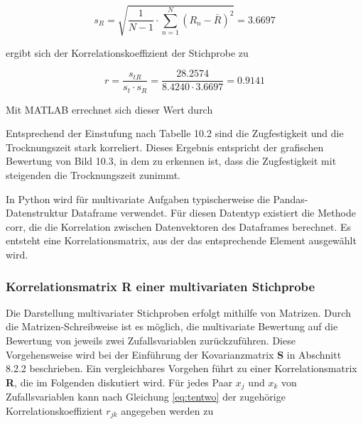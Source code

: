 \begin{equation}\label{eq:tenfive}
s_{R} =\sqrt{\dfrac{1}{N-1} \cdot \sum _{n=1}^{N}(R_{n} -\bar{R})^{2}} =3.6697
\end{equation}

\noindent ergibt sich der Korrelationskoeffizient der Stichprobe zu

\begin{equation}\label{eq:tensix}
r=\dfrac{s_{tR}}{s_{t} \cdot s_{R}} =\dfrac{28.2574}{8.4240\cdot 3.6697} =0.9141
\end{equation}

\noindent Mit MATLAB errechnet sich dieser Wert durch



\noindent Entsprechend der Einstufung nach Tabelle 10.2 sind die Zugfestigkeit und die Trocknungszeit stark korreliert. Dieses Ergebnis entspricht der grafischen Bewertung von Bild 10.3, in dem zu erkennen ist, dass die Zugfestigkeit mit steigenden die Trocknungszeit zunimmt.\newline

\noindent In Python wird f\"{u}r multivariate Aufgaben typischerweise die Pandas-Datenstruktur Dataframe verwendet. F\"{u}r diesen Datentyp existiert die Methode corr, die die Korrelation zwischen Datenvektoren des Dataframes berechnet. Es entsteht eine Korrelationsmatrix, aus der das entsprechende Element ausgew\"{a}hlt wird.

\clearpage



\subsubsection{Korrelationsmatrix R einer multivariaten Stichprobe}

\noindent Die Darstellung multivariater Stichproben erfolgt mithilfe von Matrizen. Durch die Matrizen-Schreibweise ist es m\"{o}glich, die multivariate Bewertung auf die Bewertung von jeweils zwei Zufallsvariablen zur\"{u}ckzuf\"{u}hren. Diese Vorgehensweise wird bei der Einf\"{u}hrung der Kovarianzmatrix \textbf{S} in Abschnitt 8.2.2 beschrieben. Ein vergleichbares Vorgehen f\"{u}hrt zu einer Korrelationsmatrix \textbf{R}, die im Folgenden diskutiert wird. F\"{u}r jedes Paar $x_{j}$ und $x_{k}$ von Zufallsvariablen kann nach Gleichung \eqref{eq:tentwo} der zugeh\"{o}rige Korrelationskoeffizient $r_{jk}$ angegeben werden zu

